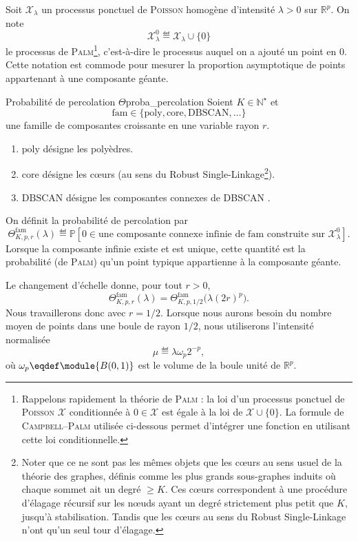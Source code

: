 Soit $\mathcal X_\lambda$ un processus ponctuel de \textsc{Poisson} homogène d'intensité $\lambda>0$ sur $\mathbb R^p$. On note
\[
    \mathcal X_\lambda^0 \eqdef \mathcal X_\lambda\cup\{0\}
\]
le processus de \textsc{Palm}\footnote{Rappelons rapidement la théorie de \textsc{Palm} \cite{BB} : la loi d'un processus ponctuel de \textsc{Poisson} $\mathcal X$ conditionnée à $0 \in \mathcal X$ est égale à la loi de $\mathcal X \cup \{0\}$. La formule de \textsc{Campbell--Palm} utilisée ci-dessous permet d'intégrer une fonction en utilisant cette loi conditionnelle.}, c'est-à-dire le processus auquel on a ajouté un point en $0$. Cette notation est commode pour mesurer la proportion asymptotique de points appartenant à une composante géante.

\begin{Definition}{Probabilité de percolation $\Theta$}{proba_percolation}
Soient $K\in\mathbb N^\star$ et
\[
    \mathrm{fam}\in\{\mathrm{poly},\mathrm{core},\mathrm{DBSCAN},\ldots\}
\]
une famille de composantes croissante en une variable rayon $r$. 
\begin{enumerate}
    \item $\mathrm{poly}$ désigne les polyèdres.
    \item $\mathrm{core}$ désigne les cœurs (au sens du Robust Single-Linkage\footnote{Noter que ce ne sont pas les mêmes objets que les cœurs au sens usuel de la théorie des graphes, définis comme les plus grands sous-graphes induits où chaque sommet ait un degré $\ge K$. Ces cœurs correspondent à une procédure d'élagage récursif sur les nœuds ayant un degré strictement plus petit que $K$, jusqu'à stabilisation. Tandis que les cœurs au sens du Robust Single-Linkage n'ont qu'un seul tour d'élagage.}).
    \item $\mathrm{DBSCAN}$ désigne les composantes connexes de DBSCAN \cite{DBSCAN}.
\end{enumerate} 
On définit la probabilité de percolation par
\[
    \Theta^{\mathrm{fam}}_{K,p,r}(\lambda)
    \eqdef
    \mathbb P\left[
    0\in \text{une composante connexe infinie de }\mathrm{fam}
    \text{ construite sur }\mathcal X_\lambda^0
    \right].
\]
Lorsque la composante infinie existe et est unique, cette quantité est la probabilité (de \textsc{Palm}) qu'un point typique appartienne à la composante géante.
\end{Definition}

Le changement d'échelle donne, pour tout $r>0$,
\[
    \Theta^{\mathrm{fam}}_{K,p,r}(\lambda)
    =
    \Theta^{\mathrm{fam}}_{K,p,1/2}\bigl(\lambda(2r)^p\bigr).
\]
Nous travaillerons donc avec $r=1/2$. Lorsque nous aurons besoin du nombre moyen de points dans une boule de rayon $1/2$, nous utiliserons l'intensité normalisée
\[
    \mu \eqdef \lambda \omega_p 2^{-p},
\]
où $\omega_p \eqdef \module{B(0,1)}$ est le volume de la boule unité de $\mathbb R^p$.

